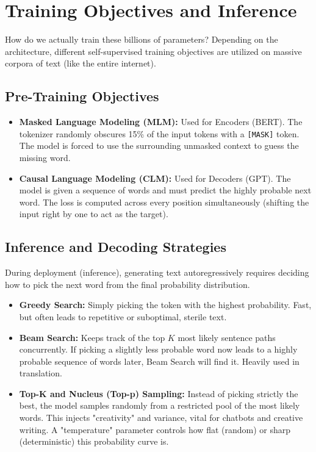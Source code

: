 \documentclass[11pt, a4paper]{article}
\begin{document}
\section{Training Objectives and Inference}

How do we actually train these billions of parameters? Depending on the architecture, different self-supervised training objectives are utilized on massive corpora of text (like the entire internet).

\subsection{Pre-Training Objectives}
\begin{itemize}
    \item \textbf{Masked Language Modeling (MLM):} Used for Encoders (BERT). The tokenizer randomly obscures 15\% of the input tokens with a \texttt{[MASK]} token. The model is forced to use the surrounding unmasked context to guess the missing word. 
    \item \textbf{Causal Language Modeling (CLM):} Used for Decoders (GPT). The model is given a sequence of words and must predict the highly probable next word. The loss is computed across every position simultaneously (shifting the input right by one to act as the target).
\end{itemize}

\subsection{Inference and Decoding Strategies}
During deployment (inference), generating text autoregressively requires deciding how to pick the next word from the final probability distribution.
\begin{itemize}
    \item \textbf{Greedy Search:} Simply picking the token with the highest probability. Fast, but often leads to repetitive or suboptimal, sterile text.
    \item \textbf{Beam Search:} Keeps track of the top $K$ most likely sentence paths concurrently. If picking a slightly less probable word now leads to a highly probable sequence of words later, Beam Search will find it. Heavily used in translation.
    \item \textbf{Top-K and Nucleus (Top-p) Sampling:} Instead of picking strictly the best, the model samples randomly from a restricted pool of the most likely words. This injects "creativity" and variance, vital for chatbots and creative writing. A "temperature" parameter controls how flat (random) or sharp (deterministic) this probability curve is.
\end{itemize}
\end{document}
